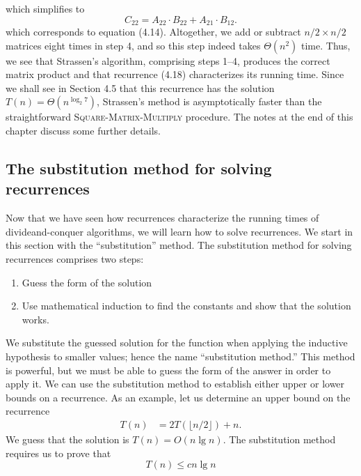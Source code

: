 \documentclass{report}
\begin{document}
        which simplifies to
        \[
            C_{22} = A_{22} \cdot B_{22} + A_{21} \cdot B_{12}.
        \]
        \bigbreak \noindent 
        which corresponds to equation (4.14). Altogether, we add or subtract \(n/2 \times n/2\) matrices eight times in step 4, and so this step indeed takes \(\Theta(n^2)\) time.
        \bigbreak \noindent 
        Thus, we see that Strassen’s algorithm, comprising steps 1--4, produces the correct matrix product and that recurrence (4.18) characterizes its running time. Since we shall see in Section 4.5 that this recurrence has the solution \(T(n) = \Theta(n^{\log_2 7})\), Strassen’s method is asymptotically faster than the straightforward \textsc{Square-Matrix-Multiply} procedure. The notes at the end of this chapter discuss some further details.

        \pagebreak 
        \subsection{The substitution method for solving recurrences}
        \bigbreak \noindent 
        Now that we have seen how recurrences characterize the running times of divideand-conquer algorithms, we will learn how to solve recurrences. We start in this section with the “substitution” method.
        \bigbreak \noindent 
        The substitution method for solving recurrences comprises two steps:
        \begin{enumerate}
            \item  Guess the form of the solution
            \item Use mathematical induction to find the constants and show that the solution works.
        \end{enumerate}
        \bigbreak \noindent 
        We substitute the guessed solution for the function when applying the inductive hypothesis to smaller values; hence the name “substitution method.” This method is powerful, but we must be able to guess the form of the answer in order to apply it.
        \bigbreak \noindent 
        We can use the substitution method to establish either upper or lower bounds on a recurrence. As an example, let us determine an upper bound on the recurrence
        \begin{align*}
            T(n) &= 2T\left(\lfloor n/2\rfloor\right) + n
        .\end{align*}
        \bigbreak \noindent 
        We guess that the solution is $T(n) = O(n\lg n)$. The substitution method requires us to prove that 
        \[ T(n) \leq c n \lg n \]
\end{document}
